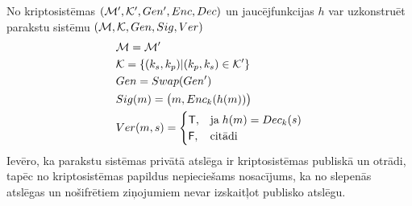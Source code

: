 No kriptosistēmas $(\mathcal{M}', \mathcal{K}', Gen', Enc, Dec)$ un jaucējfunkcijas $h$ var uzkonstruēt parakstu sistēmu $(\mathcal{M}, \mathcal{K}, Gen, Sig, Ver)$
\begin{align*}
    & \mathcal{M} = \mathcal{M}' \\
    & \mathcal{K} = \left\{ (k_s, k_p) | (k_p, k_s) \in \mathcal{K}' \right\} \\
    & Gen = Swap(Gen') \\
    & Sig(m) = \big(m, Enc_k(h(m))\big)  \\
    & Ver(m,s) =
    \begin{cases}
        \textsf{T}, &\text{ja}\; h(m) = Dec_k(s) \\
        \textsf{F}, &\text{citādi}
    \end{cases}
\end{align*}
Ievēro, ka parakstu sistēmas privātā atslēga ir kriptosistēmas publiskā un otrādi, tapēc no kriptosistēmas papildus nepieciešams nosacījums, ka no slepenās atslēgas un nošifrētiem ziņojumiem nevar izskaitļot publisko atslēgu.
